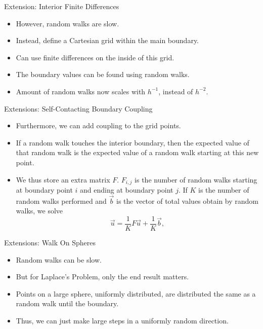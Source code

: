 \documentclass{beamer}
\newcommand\mat[1]{#1}
\begin{document}
\begin{frame}{Extension: Interior Finite Differences}
\begin{itemize}
\item However, random walks are slow.
\item Instead, define a Cartesian grid within the main boundary.
\item Can use finite differences on the inside of this grid.
\item The boundary values can be found using random walks.
\item Amount of random walks now scales with $h^{-1}$, instead of $h^{-2}$.
\end{itemize}
\end{frame}

\begin{frame}{Extensions: Self-Contacting Boundary Coupling}
\begin{itemize}
\item Furthermore, we can add coupling to the grid points.
\item If a random walk touches the interior boundary,
then the expected value of that random walk
is the expected value of a random walk starting at this new point.
\item We thus store an extra matrix $\mat{F}$.
$F_{i,j}$ is the number of random walks starting at boundary point $i$
and ending at boundary point $j$.
If $K$ is the number of random walks performed
and $\vec{b}$ is the vector of total values obtain by random walks,
we solve
$$\vec{u}=\frac{1}{K}\mat{F}\vec{u}+\frac{1}{K}\vec{b},$$
\end{itemize}
\end{frame}

\begin{frame}{Extensions: Walk On Spheres}
\begin{itemize}
\item Random walks can be slow.
\item But for Laplace's Problem, only the end result matters.
\item Points on a large sphere, uniformly distributed,
are distributed the same as a random walk until the boundary.
\item Thus, we can just make large steps in a uniformly random direction.
\end{itemize}
\end{frame}
\end{document}
